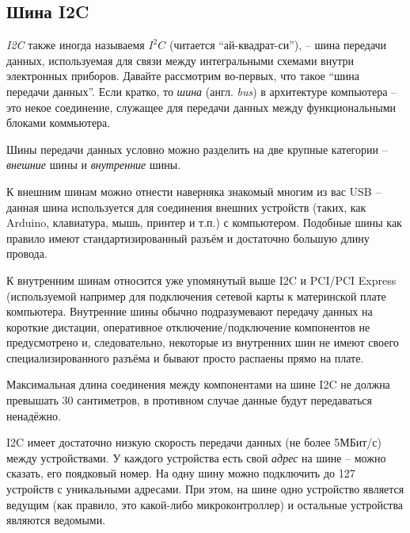 \documentclass[../sparc.tex]{subfiles}
\begin{document}
\subsection{Шина I2C}




\textit{\gls{I2C}} также иногда называемя $I^{2}C$ (читается ``ай-квадрат-си''),
-- шина передачи данных, используемая для связи между интегральными схемами
внутри электронных приборов. Давайте рассмотрим во-первых, что такое ``шина
передачи данных''. Если кратко, то \textit{шина} (англ. \textit{bus}) в
архитектуре компьютера -- это некое соединение, служащее для передачи данных
между функциональными блоками коммьютера.

Шины передачи данных условно можно разделить на две крупные категории --
\textit{внешние} шины и \textit{внутренние} шины.

К внешним шинам можно отнести наверняка знакомый многим из вас \gls{USB} --
данная шина используется для соединения внешних устройств (таких, как Arduino,
клавиатура, мышь, принтер и т.п.) с компьютером.  Подобные шины как правило
имеют стандартизированный разъём и достаточно большую длину провода.

К внутренним шинам относится уже упомянутый выше \gls{I2C} и \gls{PCI}/PCI
Express (используемой например для подключения сетевой карты к материнской плате
компьютера.  Внутренние шины обычно подразумевают передачу данных на короткие
дистации, оперативное отключение/подключение компонентов не предусмотрено и,
следовательно, некоторые из внутренних шин не имеют своего специализированного
разъёма и бывают просто распаены прямо на плате.

Максимальная длина соединения между компонентами на шине \gls{I2C} не должна
превышать 30 сантиметров, в противном случае данные будут передаваться
ненадёжно.

\gls{I2C} имеет достаточно низкую скорость передачи данных (не более 5МБит/с)
между устройствами. У каждого устройства есть свой \textit{адрес} на шине --
можно сказать, его поядковый номер. На одну шину можно подключить до 127
устройств с уникальными адресами. При этом, на шине одно устройство является
ведущим (как правило, это какой-либо микроконтроллер) и остальные устройства
являются ведомыми.
\end{document}
